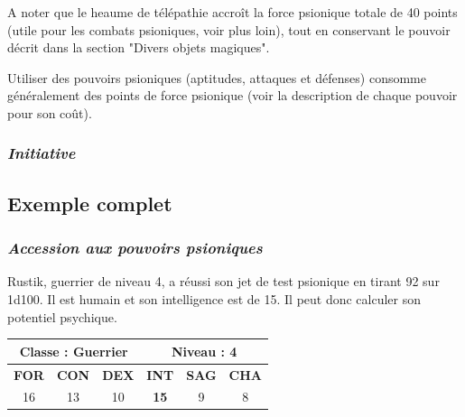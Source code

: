 \documentclass[11pt]{article}
\begin{document}
{\bigskip

A noter que le heaume de télépathie accroît la force psionique totale de 40 points (utile pour les combats psioniques, voir plus loin), tout en conservant le pouvoir décrit dans la section "Divers objets magiques".

\bigskip

Utiliser des pouvoirs psioniques (aptitudes, attaques et défenses) consomme généralement des points de force psionique (voir la description de chaque pouvoir pour son coût).

\subsubsection*{\textit{Initiative}}








\newpage
\subsection*{Exemple complet}

\subsubsection*{\textit{Accession aux pouvoirs psioniques}}

Rustik, guerrier de niveau 4, a réussi son jet de test psionique en tirant 92 sur 1d100. Il est humain et son intelligence est de 15. Il peut donc calculer son potentiel psychique.

\bigskip

\begin{tabular}{|c|c|c|c|c|c|}
\hline
\multicolumn{3}{|c|}{\textbf{Classe} : Guerrier} & \multicolumn{3}{c|}{\textbf{Niveau} : 4} \\ \hline
\textbf{FOR} & \textbf{CON} & \textbf{DEX} & \textbf{INT} & \textbf{SAG} & \textbf{CHA} \\ \hline
16 & 13 & 10 & \textbf{15} & 9 & 8 \\ \hline
\end{tabular}

}
\end{document}
